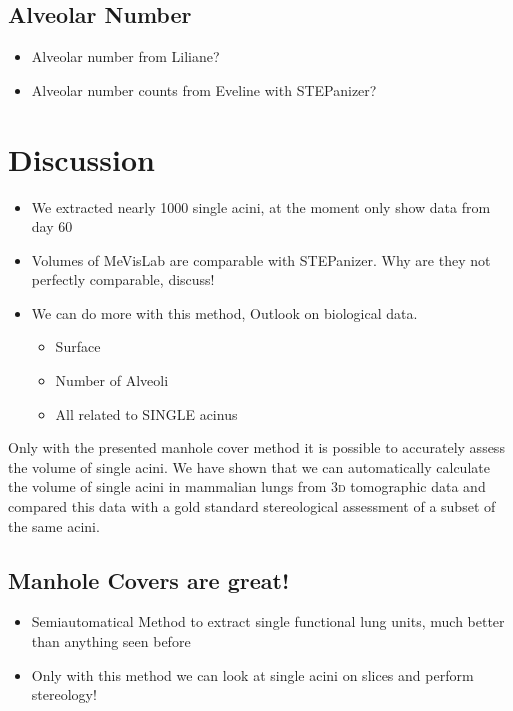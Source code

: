 \documentclass[%
	paper=a4,%
	DIV=calc,%
	twoside=true,%
	abstract=true,%
	]{scrartcl}
\newcommand{\threed}{3\textsc{d}\xspace}
\begin{document}
\subsection{Alveolar Number}
\begin{itemize}
	\item Alveolar number from Liliane?
	\item Alveolar number counts from Eveline with STEPanizer?
\end{itemize}

\section{Discussion\label{sec:Discussion}}
\begin{itemize}
	\item We extracted nearly 1000 single acini, at the moment only show data from day 60
	\item Volumes of MeVisLab are comparable with STEPanizer. Why are they not perfectly comparable, discuss!
	\item We can do more with this method, Outlook on biological data.
	\begin{itemize}
		\item Surface
		\item Number of Alveoli
		\item All related to SINGLE acinus
	\end{itemize}
\end{itemize}

Only with the presented manhole cover method it is possible to accurately assess the volume of single acini. We have shown that we can automatically calculate the volume of single acini in mammalian lungs from \threed tomographic data and compared this data with a gold standard stereological assessment of a subset of the same acini.
\subsection{Manhole Covers are great!}
\begin{itemize}
	\item Semiautomatical Method to extract single functional lung units, much better than anything seen before
	\item Only with this method we can look at single acini on slices and perform stereology!
\end{itemize}
\end{document}
